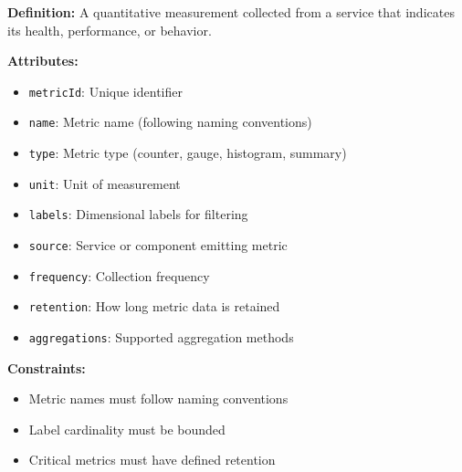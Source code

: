 \documentclass[11pt,letterpaper]{article}
\begin{document}
\begin{definitionbox}
\textbf{Definition:} A quantitative measurement collected from a service that indicates its health, performance, or behavior.

\textbf{Attributes:}
\begin{itemize}[nosep]
    \item \texttt{metricId}: Unique identifier
    \item \texttt{name}: Metric name (following naming conventions)
    \item \texttt{type}: Metric type (counter, gauge, histogram, summary)
    \item \texttt{unit}: Unit of measurement
    \item \texttt{labels}: Dimensional labels for filtering
    \item \texttt{source}: Service or component emitting metric
    \item \texttt{frequency}: Collection frequency
    \item \texttt{retention}: How long metric data is retained
    \item \texttt{aggregations}: Supported aggregation methods
\end{itemize}

\textbf{Constraints:}
\begin{itemize}[nosep]
    \item Metric names must follow naming conventions
    \item Label cardinality must be bounded
    \item Critical metrics must have defined retention
\end{itemize}
\end{definitionbox}
\end{document}
